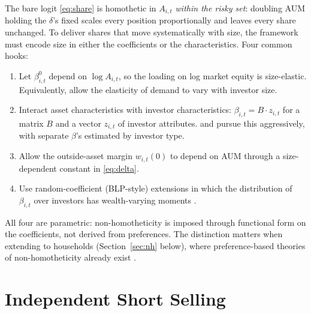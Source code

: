 \documentclass[11pt,a4paper]{article}
\begin{document}
The bare logit \eqref{eq:share} is homothetic in $A_{i,t}$ \emph{within
the risky set}: doubling AUM holding the $\delta$'s fixed scales every
position proportionally and leaves every share unchanged. To deliver
shares that move systematically with size, the framework must encode
size in either the coefficients or the characteristics. Four common
hooks:
\begin{enumerate}
\item Let $\beta^0_{i,t}$ depend on $\log A_{i,t}$, so the loading on
log market equity is size-elastic. Equivalently, allow the elasticity
of demand to vary with investor size.
\item Interact asset characteristics with investor characteristics:
$\beta_{i,t} = B \cdot z_{i,t}$ for a matrix $B$ and a vector
$z_{i,t}$ of investor attributes. \citet{koijen2024which} and
\citet{koijen2020global} pursue this aggressively, with separate
$\beta$'s estimated by investor type.
\item Allow the outside-asset margin $w_{i,t}(0)$ to depend on AUM
through a size-dependent constant in \eqref{eq:delta}.
\item Use random-coefficient (BLP-style) extensions in which the
distribution of $\beta_{i,t}$ over investors has wealth-varying
moments \citep{blp1995,nevo2001measuring}.
\end{enumerate}
All four are parametric: non-homotheticity is imposed through
functional form on the coefficients, not derived from preferences. The
distinction matters when extending to households (Section~\ref{sec:nh}
below), where preference-based theories of non-homotheticity already
exist \citep{wachter2010luxury}.

\section{Independent Short Selling}\label{sec:short-inst}
\end{document}
